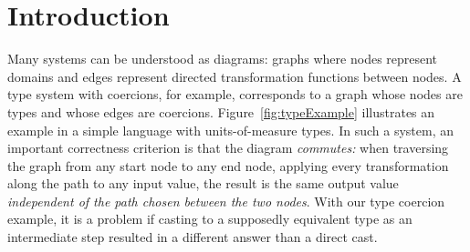 \documentclass[sigplan,review,anonymous]{acmart}
\begin{document}
\section{Introduction}
Many systems can be understood as diagrams: graphs where nodes represent domains and edges represent directed transformation functions between nodes.
A type system with coercions, for example, corresponds to a graph whose nodes are types and whose edges are coercions.
Figure~\ref{fig:typeExample} illustrates an example in a simple language with units-of-measure types.
In such a system, an important correctness criterion is that the diagram \emph{commutes:} when traversing the graph from any start node to any end node, applying every transformation along the path to any input value, the result is the same output value \emph{independent of the path chosen between the two nodes}.
With our type coercion example, it is a problem if casting to a supposedly equivalent type as an intermediate step resulted in a different answer than a direct cast.
\end{document}
